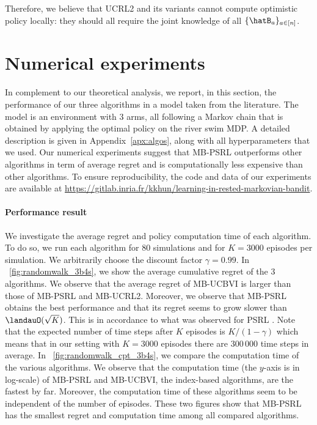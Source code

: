 Therefore, we  believe that UCRL2 and its variants cannot compute optimistic  policy locally: they should all require the joint knowledge of all $\{\hatB_a\}_{a\in[n]}$.


\section{Numerical experiments}
\label{sec:numerical}

In complement to our theoretical analysis, we report, in this section, the performance of our three algorithms in a model taken from the literature. %
The model is an environment with 3 arms, all following a Markov chain that is obtained by applying the optimal policy on the river swim MDP. A detailed description is given in Appendix~\ref{apx:algos}, along with all hyperparameters that we used. Our numerical experiments suggest that MB-PSRL outperforms other algorithms in term of average regret and is computationally less expensive than other algorithms. To ensure reproducibility, the code and data of our experiments are available at \url{https://gitlab.inria.fr/kkhun/learning-in-rested-markovian-bandit}.

\paragraph{Performance result}
We investigate the average regret and policy computation time of each algorithm.
To do so, we run each algorithm for $80$ simulations and for $K=3000$ episodes per simulation. We arbitrarily choose the discount factor $\gamma=0.99$. In \figurename~\ref{fig:randomwalk_3b4s}, we show the average cumulative regret of the 3 algorithms. We observe that the average regret of MB-UCBVI is larger than those of MB-PSRL and MB-UCRL2.
Moreover, we observe that MB-PSRL obtains the best performance and that its regret seems to grow slower than $\landauO(\sqrt{K})$. This is in accordance to what was observed for PSRL \cite{osband2013more}. 
Note that the expected number of time steps after $K$ episodes is $K/(1-\gamma)$ which means that in our setting with $K=3000$ episodes there are $300\,000$ time steps in average. 
In \figurename~\ref{fig:randomwalk_cpt_3b4s}, we compare the computation time of the various algorithms. We observe that the computation time (the $y$-axis is in log-scale) of MB-PSRL and MB-UCBVI, the index-based algorithms, are the fastest by far. 
Moreover, the computation time of these algorithms seem to be independent of the number of episodes. 
These two figures show that MB-PSRL has the smallest regret and computation time among all compared algorithms.

